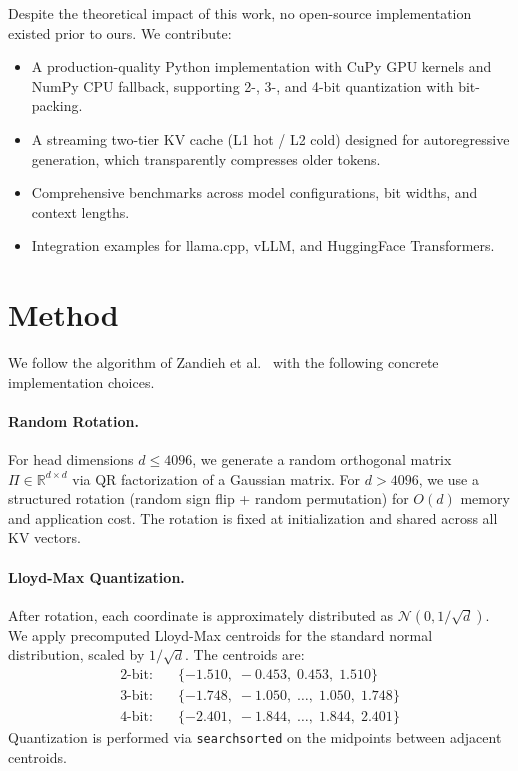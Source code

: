 \documentclass{article}
\begin{document}
Despite the theoretical impact of this work, no open-source implementation
existed prior to ours.  We contribute:
\begin{itemize}
  \item A production-quality Python implementation with CuPy GPU kernels
    and NumPy CPU fallback, supporting 2-, 3-, and 4-bit quantization with
    bit-packing.
  \item A streaming two-tier KV cache (L1 hot / L2 cold) designed for
    autoregressive generation, which transparently compresses older tokens.
  \item Comprehensive benchmarks across model configurations, bit widths,
    and context lengths.
  \item Integration examples for llama.cpp, vLLM, and HuggingFace
    Transformers.
\end{itemize}

\section{Method}
\label{sec:method}

We follow the algorithm of Zandieh et al.~\cite{turboquant}
with the following concrete implementation choices.

\paragraph{Random Rotation.}
For head dimensions $d \leq 4096$, we generate a random orthogonal matrix
$\Pi \in \mathbb{R}^{d \times d}$ via QR factorization of a Gaussian
matrix.  For $d > 4096$, we use a structured rotation (random sign flip +
random permutation) for $O(d)$ memory and application cost.  The rotation
is fixed at initialization and shared across all KV vectors.

\paragraph{Lloyd-Max Quantization.}
After rotation, each coordinate is approximately distributed as
$\mathcal{N}(0, 1/\sqrt{d})$.  We apply precomputed Lloyd-Max centroids
for the standard normal distribution, scaled by $1/\sqrt{d}$.  The
centroids are:
\begin{align}
  \text{2-bit:} &\quad \{-1.510,\; -0.453,\; 0.453,\; 1.510\} \\
  \text{3-bit:} &\quad \{-1.748,\; -1.050,\; \ldots,\; 1.050,\; 1.748\} \\
  \text{4-bit:} &\quad \{-2.401,\; -1.844,\; \ldots,\; 1.844,\; 2.401\}
\end{align}
Quantization is performed via \texttt{searchsorted} on the midpoints
between adjacent centroids.
\end{document}
